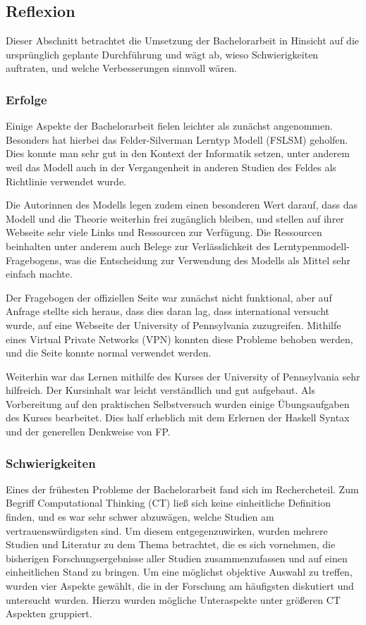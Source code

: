 \subsection{Reflexion}
Dieser Abschnitt betrachtet die Umsetzung der Bachelorarbeit in Hinsicht auf die ursprünglich geplante Durchführung und wägt ab, wieso Schwierigkeiten auftraten, und welche Verbesserungen sinnvoll wären.

\subsubsection{Erfolge}
Einige Aspekte der Bachelorarbeit fielen leichter als zunächst angenommen. Besonders hat hierbei das Felder-Silverman Lerntyp Modell (FSLSM) geholfen. Dies konnte man sehr gut in den Kontext der Informatik setzen, unter anderem weil das Modell auch in der Vergangenheit in anderen Studien des Feldes als Richtlinie verwendet wurde.

Die Autorinnen des Modells legen zudem einen besonderen Wert darauf, dass das Modell und die Theorie weiterhin frei zugänglich bleiben, und stellen auf ihrer Webseite sehr viele Links und Ressourcen zur Verfügung. Die Ressourcen beinhalten unter anderem auch Belege zur Verlässlichkeit des Lerntypenmodell-Fragebogens, was die Entscheidung zur Verwendung des Modells als Mittel sehr einfach machte.

Der Fragebogen der offiziellen Seite war zunächst nicht funktional, aber auf Anfrage stellte sich heraus, dass dies daran lag, dass international versucht wurde, auf eine Webseite der University of Pennsylvania zuzugreifen. Mithilfe eines Virtual Private Networks (VPN) konnten diese Probleme behoben werden, und die Seite konnte normal verwendet werden.

Weiterhin war das Lernen mithilfe des Kurses der University of Pennsylvania sehr hilfreich. Der Kursinhalt war leicht verständlich und gut aufgebaut. Als Vorbereitung auf den praktischen Selbstversuch wurden einige Übungsaufgaben des Kurses bearbeitet. Dies half erheblich mit dem Erlernen der Haskell Syntax und der generellen Denkweise von FP.

\subsubsection{Schwierigkeiten}
Eines der frühesten Probleme der Bachelorarbeit fand sich im Rechercheteil. Zum Begriff Computational Thinking (CT) ließ sich keine einheitliche Definition finden, und es war sehr schwer abzuwägen, welche Studien am vertrauenswürdigsten sind.
Um diesem entgegenzuwirken, wurden mehrere Studien und Literatur zu dem Thema betrachtet, die es sich vornehmen, die bisherigen Forschungsergebnisse aller Studien zusammenzufassen und auf einen einheitlichen Stand zu bringen. Um eine möglichst objektive Auswahl zu treffen, wurden vier Aspekte gewählt, die in der Forschung am häufigsten diskutiert und untersucht wurden. Hierzu wurden mögliche Unteraspekte unter größeren CT Aspekten gruppiert.

